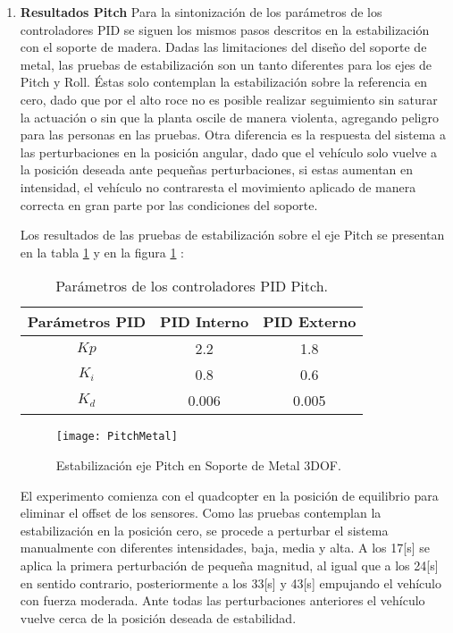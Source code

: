 \documentclass[\main/main.tex]{subfiles}
\begin{document}
\begin{enumerate}
	\item \textbf{Resultados Pitch}
	Para la sintonización de los parámetros de los controladores PID se
	siguen los mismos pasos descritos en la estabilización con el soporte
	de madera. Dadas las limitaciones del diseño del soporte de metal, las pruebas
	de estabilización son un tanto diferentes para los ejes de Pitch y
	Roll. Éstas solo contemplan la estabilización sobre la referencia
	en cero, dado que por el alto roce no es posible realizar seguimiento
	sin saturar la actuación o sin que la planta oscile de manera violenta,
	agregando peligro para las personas en las pruebas. Otra diferencia es la respuesta
	del sistema a las perturbaciones en la posición angular, dado que
	el vehículo solo vuelve a la posición deseada ante pequeñas perturbaciones,
	si estas aumentan en intensidad, el vehículo no contraresta el movimiento
	aplicado de manera correcta en gran parte por las condiciones del
	soporte.

	Los resultados de las pruebas de estabilización sobre el eje Pitch
	se presentan en la tabla \ref{table: Parametros Pitch Me} y en la figura \ref{fig: Resultados Pitch Me} :

	\begin{table}[H]
	\noindent \begin{centering}
	\begin{tabular}{|c|c|c|}
	\hline 
	Parámetros PID & PID Interno & PID Externo\tabularnewline
	\hline 
	\hline 
	$Kp$ & 2.2 & 1.8\tabularnewline
	\hline 
	$K_{i}$ & 0.8 & 0.6\tabularnewline
	\hline 
	$K_{d}$ & 0.006 & 0.005\tabularnewline
	\hline 
	\end{tabular}
	\par\end{centering}
	\caption{Parámetros de los controladores PID Pitch.}\label{table: Parametros Pitch Me}\noindent
	\end{table}

	\begin{figure}[H]
	\noindent \begin{centering}
	\texttt{[image: PitchMetal]}
	\par\end{centering}
	\caption{Estabilización eje Pitch en Soporte de Metal 3DOF.}\label{fig: Resultados Pitch Me}\noindent
	\end{figure}

	El experimento comienza con el quadcopter en la posición de equilibrio
	para eliminar el offset de los sensores. Como las pruebas contemplan
	la estabilización en la posición cero, se procede a perturbar el sistema
	manualmente con diferentes intensidades, baja, media y alta. A los 17{[}s{]} se aplica la primera
	perturbación de pequeña magnitud, al igual que a los 24{[}s{]} en
	sentido contrario, posteriormente a los 33{[}s{]} y 43{[}s{]} empujando
	el vehículo con fuerza moderada. Ante todas las perturbaciones anteriores
	el vehículo vuelve cerca de la posición deseada de estabilidad. 


\end{enumerate}
\end{document}
